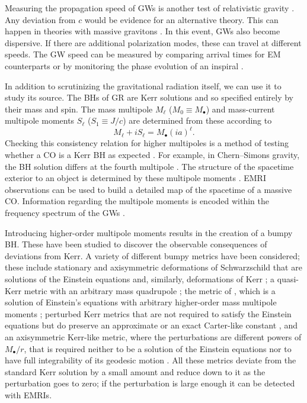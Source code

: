 Measuring the propagation speed of GWs is another test of relativistic gravity \citep[section 10.1]{Will1993}. Any deviation from $c$ would be evidence for an alternative theory. This can happen in theories with massive gravitons \citep{Babak2003,Goldhaber2010}. In this event, GWs also become dispersive. If there are additional polarization modes, these can travel at different speeds. The GW speed can be measured by comparing arrival times for EM counterparts \citep[e.g.,][]{Cooray2004,Kocsis2008} or by monitoring the phase evolution of an inspiral \citep{Will1998,Berti2011}.

In addition to scrutinizing the gravitational radiation itself, we can use it to study its source. The BHs of GR are Kerr solutions and so specified entirely by their mass and spin. The mass multipole $M_\ell$ ($M_0 \equiv M_\bullet$) and mass-current multipole moments $S_\ell$ ($S_1 \equiv J/c$) are determined from these according to \citep{Hansen1974}
\begin{equation}
M_\ell + iS_\ell = M_\bullet \left(ia\right)^\ell.
\end{equation}
Checking this consistency relation for higher multipoles is a method of testing whether a CO is a Kerr BH as expected \citep{Gair2012a}. For example, in Chern--Simons gravity, the BH solution differs at the fourth multipole \citep{Sopuerta2009a}.  The structure of the spacetime exterior to an object is determined by these multipole moments \citep{Geroch1970}. EMRI observations can be used to build a detailed map of the spacetime of a massive CO. Information regarding the multipole moments is encoded within the frequency spectrum of the GWs \citep{Ryan1995,Ryan1997}.

Introducing higher-order multipole moments results in the creation of a bumpy BH. These have been studied to discover the observable consequences of deviations from Kerr. A variety of different bumpy metrics have been considered; these include stationary and axisymmetric deformations of Schwarzschild that are solutions of the Einstein equations \citep{Collins2004} and, similarly, deformations of Kerr \citep{Vigeland2010a}; a quasi-Kerr metric with an arbitrary mass quadrupole \citep{Glampedakis2006a,Barack2007}; the metric of \citet{Manko1992}, which is a solution of Einstein's equations with arbitrary higher-order mass multipole moments \citep{Gair2008}; perturbed Kerr metrics that are not required to satisfy the Einstein equations but do preserve an approximate or an exact Carter-like constant \citep{Vigeland2011,Gair2011,Johannsen2013b}, and an axisymmetric Kerr-like metric, where the perturbations are different powers of $M_\bullet/r$, that is required neither to be a solution of the Einstein equations nor to have full integrability of its geodesic motion \citep{Johannsen2011}. All these metrics deviate from the standard Kerr solution by a small amount and reduce down to it as the perturbation goes to zero; if the perturbation is large enough it can be detected with EMRIs.

